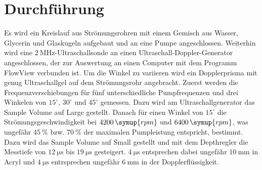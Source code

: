 \section{Durchführung}
\label{sec:Durchführung}

Es wird ein Kreislauf aus Strömungsrohren mit einem Gemisch aus Wasser, Glycerin und Glaskugeln aufgebaut
und an eine Pumpe angeschlossen. Weiterhin wird eine $\SI{2}{\mega\hertz}$-Ultraschallsonde an einen
Ultraschall-Doppler-Generator angeschlossen, der zur Auswertung an einen Computer mit dem Programm
FlowView verbunden ist. Um die Winkel zu variieren wird ein Dopplerprisma mit genug Ultraschallgel auf dem
Strömungsrohr angebracht. Zuerst werden die Frequenzverschiebungen für fünf unterschiedliche Pumpfrequenzen und
drei Winkelen von $15^{\circ}$, $30^{\circ}$ und $45^{\circ}$ gemessen. Dazu wird am Ultraschallgenerator das
Sample Volume auf Large gestellt. Danach für einen Winkel von $15^{\circ}$ die Strömungsgeschwindigkeit bei
$4200\,\symup{rpm}$ und $6400\,\symup{rpm}$, was ungefähr $\SI{45}{\%}$ bzw. $\SI{70}{\%}$ der maximalen
Pumpleistung entspricht, bestimmt. Dazu wird das Sample Volume auf Small gestellt und mit dem Depthregler
die Messtiefe von $\SI{12}{\micro\second}$ bis $\SI{19}{\micro\second}$ gesteigert. $\SI{4}{\micro\second}$
entsprechen dabei ungefähr $\SI{10}{\milli\meter}$ in Acryl und $\SI{4}{\micro\second}$ entrsprechen ungefähr
$\SI{6}{\milli\meter}$ in der Dopplerflüssigkeit.